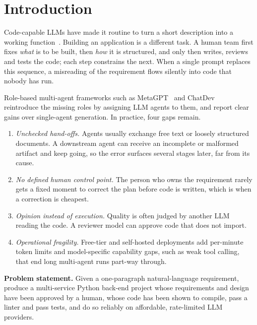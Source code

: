\documentclass[conference,letterpaper]{IEEEtran}
\begin{document}
\section{Introduction}

Code-capable LLMs have made it routine to turn a short description into a
working function~\cite{chen2021codex,austin2021mbpp,roziere2023codellama}.
Building an application is a different task. A human team first fixes
\emph{what} is to be built, then \emph{how} it is structured, and only then
writes, reviews and tests the code; each step constrains the next. When a
single prompt replaces this sequence, a misreading of the requirement flows
silently into code that nobody has run.

Role-based multi-agent frameworks such as MetaGPT~\cite{hong2024metagpt} and
ChatDev~\cite{qian2024chatdev} reintroduce the missing roles by assigning LLM
agents to them, and report clear gains over single-agent generation. In
practice, four gaps remain.

\begin{enumerate}
\item \emph{Unchecked hand-offs.} Agents usually exchange free text or loosely
structured documents. A downstream agent can receive an incomplete or malformed
artifact and keep going, so the error surfaces several stages later, far from
its cause.
\item \emph{No defined human control point.} The person who owns the requirement
rarely gets a fixed moment to correct the plan before code is written, which is
when a correction is cheapest.
\item \emph{Opinion instead of execution.} Quality is often judged by another
LLM reading the code. A reviewer model can approve code that does not import.
\item \emph{Operational fragility.} Free-tier and self-hosted deployments add
per-minute token limits and model-specific capability gaps, such as weak tool
calling, that end long multi-agent runs part-way through.
\end{enumerate}

\textbf{Problem statement.} Given a one-paragraph natural-language requirement,
produce a multi-service Python back-end project whose requirements and design
have been approved by a human, whose code has been shown to compile, pass a
linter and pass tests, and do so reliably on affordable, rate-limited LLM
providers.
\end{document}
